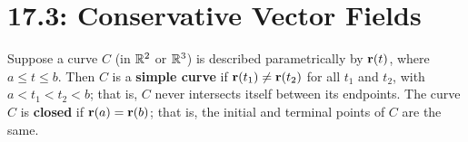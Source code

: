 \documentclass[../mathNotesPreamble]{subfiles}
\begin{document}
\section{17.3: Conservative Vector Fields}

  \begin{defn*}
    Suppose a curve $C$ (in $\mathbb{R}^2$ or $\mathbb{R}^3$) is described parametrically by ${\mathbf{r}}(t)$, where $a\leq t\leq b$. Then $C$ is a \textbf{simple curve} if ${\mathbf{r}}(t_1)\neq {\mathbf{r}}(t_2)$ for all $t_1$ and $t_2$, with $a<t_1<t_2<b$; that is, $C$ never intersects itself between its endpoints. The curve $C$ is \textbf{closed} if ${\mathbf{r}}(a)={\mathbf{r}}(b)$; that is, the initial and terminal points of $C$ are the same.
  \end{defn*}
\end{document}
